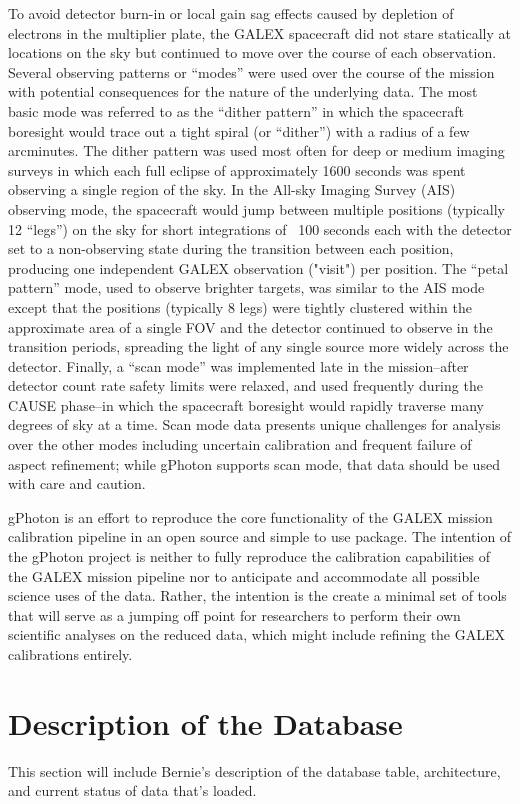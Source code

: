 \documentclass[preprint]{aastex}
\begin{document}
To avoid detector burn-in or local gain sag effects caused by depletion of electrons in the multiplier plate, the GALEX spacecraft did not stare statically at locations on the sky but continued to move over the course of each observation. Several observing patterns or “modes” were used over the course of the mission with potential consequences for the nature of the underlying data. The most basic mode was referred to as the “dither pattern” in which the spacecraft boresight would trace out a tight spiral (or “dither”) with a radius of a few arcminutes. The dither pattern was used most often for deep or medium imaging surveys in which each full eclipse of approximately 1600 seconds was spent observing a single region of the sky. In the All-sky Imaging Survey (AIS) observing mode, the spacecraft would jump between multiple positions (typically 12 “legs”) on the sky for short integrations of ~100 seconds each with the detector set to a non-observing state during the transition between each position, producing one independent GALEX observation ("visit") per position. The “petal pattern” mode, used to observe brighter targets, was similar to the AIS mode except that the positions (typically 8 legs) were tightly clustered within the approximate area of a single FOV and the detector continued to observe in the transition periods, spreading the light of any single source more widely across the detector. Finally, a “scan mode” was implemented late in the mission--after detector count rate safety limits were relaxed, and used frequently during the CAUSE phase--in which the spacecraft boresight would rapidly traverse many degrees of sky at a time. Scan mode data presents unique challenges for analysis over the other modes including uncertain calibration and frequent failure of aspect refinement; while gPhoton supports scan mode, that data should be used with care and caution.

{\color{red}gPhoton is an effort to reproduce the core functionality of the GALEX mission calibration pipeline in an open source and simple to use package. The intention of the gPhoton project is neither to fully reproduce the calibration capabilities of the GALEX mission pipeline nor to anticipate and accommodate all possible science uses of the data. Rather, the intention is the create a minimal set of tools that will serve as a jumping off point for researchers to perform their own scientific analyses on the reduced data, which might include refining the GALEX calibrations entirely.}

\section{Description of the Database}
\label{database}
This section will include Bernie's description of the database table, architecture, and current status of data that's loaded.
\end{document}
